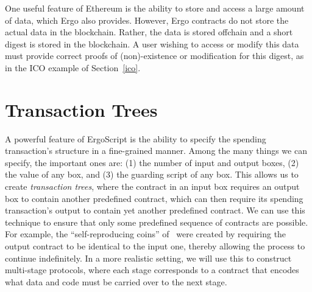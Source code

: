 \documentclass[runningheads]{llncs}
\newcommand{\langname}{ErgoScript\xspace}
\begin{document}
 
 One useful feature of Ethereum is the ability to store and access a large amount of data, which Ergo also provides.
 However, Ergo contracts do not store the actual data in the blockchain. Rather, the data is stored offchain and a short digest is stored in the blockchain. A user wishing to access or modify this data must provide correct proofs of (non)-existence or modification for this digest, as in the ICO example of Section~\ref{ico}. 

\section{Transaction Trees}
A powerful feature of \langname is the ability to specify the spending transaction's structure in a fine-grained manner. 
Among the many things we can specify, the important ones are: (1) the number of input and output boxes, (2) the value of any box, and (3) the guarding script of any box. This allows us to create {\em transaction trees}, where the contract in an input box requires an output box to contain another predefined contract, which can then require its spending transaction's output to contain yet another predefined contract. We can use this technique to ensure that only some predefined sequence of contracts are possible. For example, the ``self-reproducing coins'' of~\cite{CKM18a} were created by requiring the output contract to be identical to the input one, thereby allowing the process to continue indefinitely. In a more realistic setting, we will use this to construct multi-stage protocols, where each stage corresponds to a contract that encodes what data and code must be carried over to the next stage. 
\end{document}
